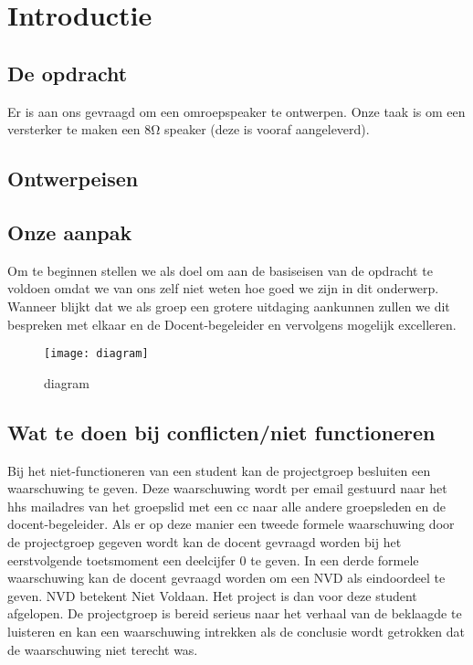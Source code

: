 \section{Introductie}
\subsection{De opdracht}
Er is aan ons gevraagd om een omroepspeaker te ontwerpen. Onze taak is om een versterker te maken een 8Ω speaker (deze is vooraf aangeleverd). 

\subsection{Ontwerpeisen}

\subsection{Onze aanpak}
Om te beginnen stellen we als doel om aan de basiseisen van de opdracht te voldoen omdat we van ons zelf niet weten hoe goed we zijn in dit onderwerp. Wanneer blijkt dat we als groep een grotere uitdaging aankunnen zullen we dit bespreken met elkaar en de Docent-begeleider en vervolgens mogelijk excelleren. 

\begin{figure}[ht]
    \centering
    \texttt{[image: diagram]}
    \caption{diagram}
    \label{fig:diagram}
\end{figure}

\subsection{Wat te doen bij conflicten/niet functioneren}
Bij het niet-functioneren van een student kan de projectgroep besluiten een waarschuwing te geven. Deze waarschuwing wordt per email gestuurd naar het hhs mailadres van het groepslid met een cc naar alle andere groepsleden en de docent-begeleider.
Als er op deze manier een tweede formele waarschuwing door de projectgroep gegeven wordt kan de docent gevraagd worden bij het eerstvolgende toetsmoment een deelcijfer 0 te geven. In een derde formele waarschuwing kan de docent gevraagd worden om een NVD als eindoordeel te geven. NVD betekent Niet Voldaan. Het project is dan voor deze student afgelopen.
De projectgroep is bereid serieus naar het verhaal van de beklaagde te luisteren en kan een waarschuwing intrekken als de conclusie wordt getrokken dat de waarschuwing niet terecht was.
